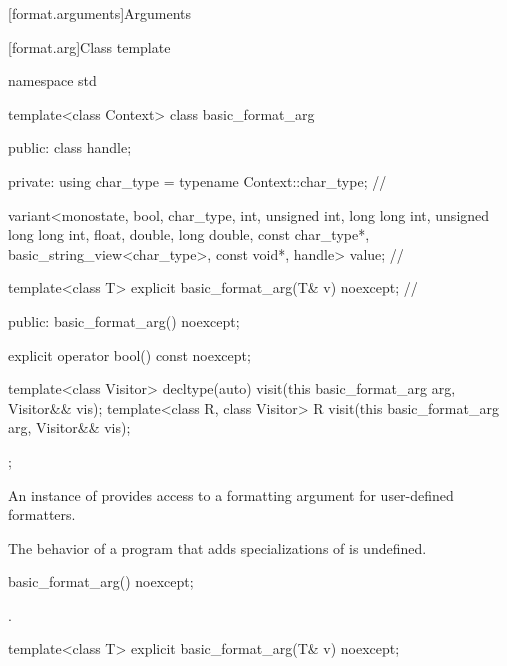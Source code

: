 [format.arguments]{Arguments}

[format.arg]{Class template }

%
\begin{codeblock}
namespace std {
  template<class Context>
  class basic_format_arg {
  public:
    class handle;

  private:
    using char_type = typename Context::char_type;                              // \expos

    variant<monostate, bool, char_type,
            int, unsigned int, long long int, unsigned long long int,
            float, double, long double,
            const char_type*, basic_string_view<char_type>,
            const void*, handle> value;                                         // \expos

    template<class T> explicit basic_format_arg(T& v) noexcept;                 // \expos

  public:
    basic_format_arg() noexcept;

    explicit operator bool() const noexcept;

    template<class Visitor>
      decltype(auto) visit(this basic_format_arg arg, Visitor&& vis);
    template<class R, class Visitor>
      R visit(this basic_format_arg arg, Visitor&& vis);
  };
}
\end{codeblock}

\pnum
An instance of  provides access to
a formatting argument for user-defined formatters.

\pnum
The behavior of a program that adds specializations of
 is undefined.

%
\begin{itemdecl}
basic_format_arg() noexcept;
\end{itemdecl}

\begin{itemdescr}
\pnum
\ensures
{}.
\end{itemdescr}

\begin{itemdecl}
template<class T> explicit basic_format_arg(T& v) noexcept;
\end{itemdecl}

